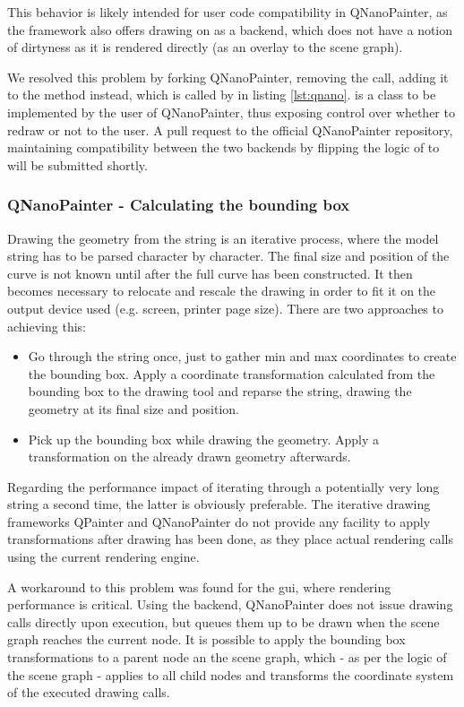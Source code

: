 This behavior is likely intended for user code compatibility in QNanoPainter, as the framework also offers drawing on  as a backend, which does not have a notion of dirtyness as it is rendered directly (as an overlay to the scene graph).

We resolved this problem by forking QNanoPainter, removing the  call, adding it to the  method instead, which is called by  in listing \ref{lst:qnano}.  is a class to be implemented by the user of QNanoPainter, thus exposing control over whether to redraw or not to the user. A pull request to the official QNanoPainter repository, maintaining compatibility between the two backends by flipping the logic of  to  will be submitted shortly.

\subsubsection{QNanoPainter - Calculating the \gls{bounding box}}\label{sec:bbcalc}
Drawing the geometry from the string is an iterative process, where the model string has to be parsed character by character. The final size and position of the curve is not known until after the full curve has been constructed.
It then becomes necessary to relocate and rescale the drawing in order to fit it on the output device used (e.g. screen, printer page size). There are two approaches to achieving this:
\begin{itemize}
	\item Go through the string once, just to gather min and max coordinates to create the bounding box. Apply a coordinate transformation calculated from the bounding box to the drawing tool and reparse the string, drawing the geometry at its final size and position.
	\item Pick up the bounding box while drawing the geometry. Apply a transformation on the already drawn geometry afterwards.
\end{itemize}
Regarding the performance impact of iterating through a potentially very long string a second time, the latter is obviously preferable. The iterative drawing frameworks QPainter and QNanoPainter do not provide any facility to apply transformations after drawing has been done, as they place actual rendering calls using the current rendering engine.

A workaround to this problem was found for the \gls{gui}, where rendering performance is critical. Using the  backend, QNanoPainter does not issue drawing calls directly upon execution, but queues them up to be drawn when the scene graph reaches the current node. It is possible to apply the bounding box transformations to a parent node an the scene graph, which - as per the logic of the scene graph - applies to all child nodes and transforms the coordinate system of the executed drawing calls.

